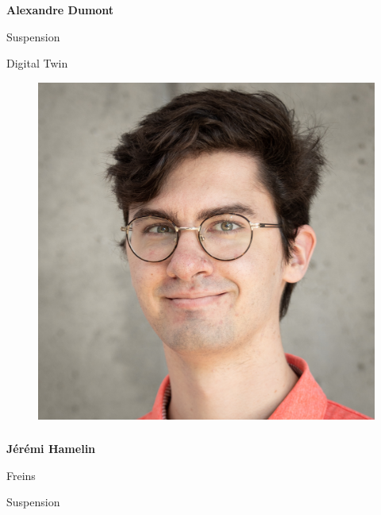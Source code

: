 \documentclass[a0paper,portrait]{baposter}
\begin{document}
\begin{poster}
{\subsubsection*{}
\vspace{2mm}
\textbf{Alexandre Dumont}

Suspension

Digital Twin

\begin{figure}
\includegraphics[width=.9\linewidth]{img/membres/Jérémi-Hamelin-3.jpg} 
\end{figure}
\subsubsection*{}
\vspace{2mm}
\textbf{Jérémi Hamelin}

Freins

Suspension

\vspace{1cm}
}



\end{poster}
\end{document}
